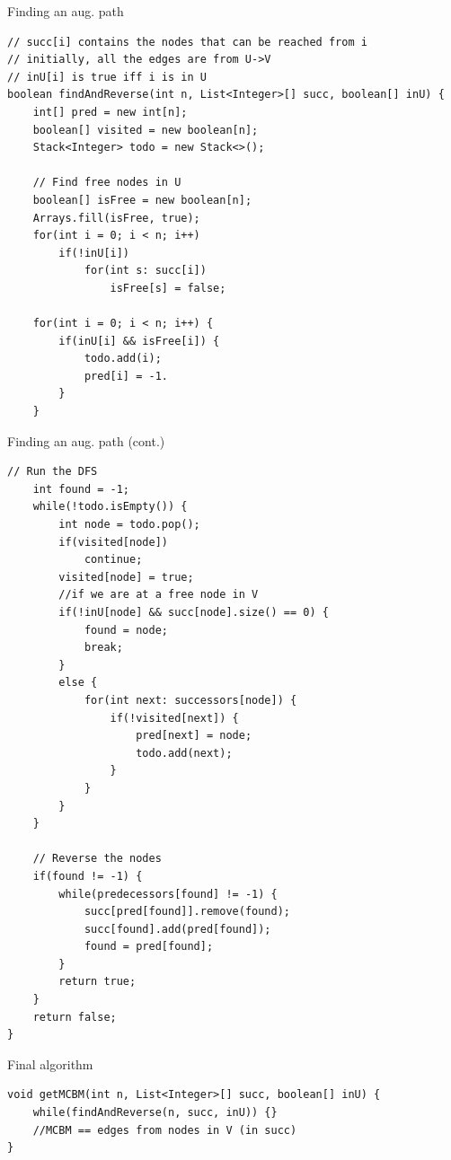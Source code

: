 \documentclass[12pt]{beamer}
\begin{document}
\begin{frame}[fragile]{Finding an aug. path}
    \begin{lstlisting}
// succ[i] contains the nodes that can be reached from i
// initially, all the edges are from U->V
// inU[i] is true iff i is in U 
boolean findAndReverse(int n, List<Integer>[] succ, boolean[] inU) {
    int[] pred = new int[n];
    boolean[] visited = new boolean[n];
    Stack<Integer> todo = new Stack<>();
    
    // Find free nodes in U
    boolean[] isFree = new boolean[n];
    Arrays.fill(isFree, true);
    for(int i = 0; i < n; i++)
        if(!inU[i])
            for(int s: succ[i])
                isFree[s] = false;
    
    for(int i = 0; i < n; i++) {
        if(inU[i] && isFree[i]) {
            todo.add(i);
            pred[i] = -1.
        }
    }\end{lstlisting}
\end{frame}

\begin{frame}[fragile]{Finding an aug. path (cont.)}
    \begin{lstlisting}[firstnumber=23]
    // Run the DFS
    int found = -1;
    while(!todo.isEmpty()) {
        int node = todo.pop();
        if(visited[node])
            continue;
        visited[node] = true;
        //if we are at a free node in V
        if(!inU[node] && succ[node].size() == 0) {
            found = node;
            break;
        }
        else {
            for(int next: successors[node]) {
                if(!visited[next]) {
                    pred[next] = node;
                    todo.add(next);
                }
            }
        }
    }
    
    // Reverse the nodes
    if(found != -1) {
        while(predecessors[found] != -1) {
            succ[pred[found]].remove(found);
            succ[found].add(pred[found]);
            found = pred[found];
        }
        return true;
    }
    return false;
}\end{lstlisting}
\end{frame}

\begin{frame}[fragile]{Final algorithm}
\begin{lstlisting}
void getMCBM(int n, List<Integer>[] succ, boolean[] inU) {
    while(findAndReverse(n, succ, inU)) {}
    //MCBM == edges from nodes in V (in succ)
}\end{lstlisting}
\end{frame}
\end{document}
